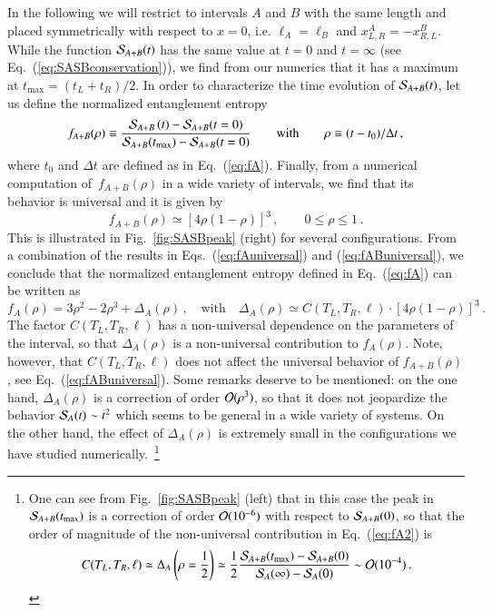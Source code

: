 \documentclass[epj]{webofc}
\begin{document}
In the following we will restrict to intervals $A$ and $B$ with the same length and placed symmetrically with respect to $x=0$, i.e. $\ell_A = \ell_B$ and $x_{L,R}^A = -x_{R,L}^B$. While the function ${\cal S}_{A+B}(t)$ has the same value at $t=0$ and $t=\infty$ (see Eq.~(\ref{eq:SASBconservation})), we find from our numerics that it has a maximum at $t_{\textrm{max}} = (t_L + t_R)/2$. In order to characterize the time evolution of ${\cal S}_{A+B}(t)$, let us define the normalized entanglement entropy
\begin{equation}
f_{A+B}(\rho) \equiv \frac{{\cal S}_{A+B}\left( t \right)-{\cal S}_{A+B}(t=0)}{{\cal S}_{A+B}(t_{\textrm{max}})-{\cal S}_{A+B}(t=0)} \qquad \textrm{with} \qquad \rho \equiv (t-t_0)/\Delta t  \,,  \label{eq:fAB}
\end{equation}
where $t_0$ and $\Delta t$ are defined as in Eq.~(\ref{eq:fA}). Finally, from a numerical computation of~$f_{A+B}(\rho)$ in a wide variety of intervals, we find that its behavior is universal and it is given by
\begin{equation}
f_{A+B}(\rho) \simeq \left[ 4\rho(1-\rho)\right]^3 \,, \qquad 0 \le \rho \le 1 \,. \label{eq:fABuniversal}
\end{equation}
This is illustrated in Fig.~\ref{fig:SASBpeak} (right) for several configurations. From a combination of the results in Eqs.~(\ref{eq:fAuniversal}) and (\ref{eq:fABuniversal}), we conclude that the normalized entanglement entropy defined in Eq.~(\ref{eq:fA}) can be written as
\begin{equation}
f_A(\rho) = 3 \rho^2 - 2 \rho^3 + \Delta_A(\rho)   \,, \quad  \textrm{with} \quad \Delta_A(\rho) \simeq   C(T_L, T_R, \ell)  \cdot [4\rho(1-\rho)]^3 \,. \label{eq:fA2}
\end{equation}
The factor $C(T_L, T_R, \ell)$ has a non-universal dependence on the parameters of the interval, so that $\Delta_A(\rho)$ is a non-universal contribution to $f_A(\rho)$. Note, however, that $C(T_L,T_R,\ell)$ does not affect the universal behavior of $f_{A+B}(\rho)$, see Eq.~(\ref{eq:fABuniversal}). Some remarks deserve to be mentioned: on the one hand, $\Delta_A(\rho)$ is a correction of order ${\cal O}(\rho^3)$, so that it does not jeopardize the behavior ${\cal S}_A(t) \sim t^2$ which seems to be general in a wide variety of systems. On the other hand, the effect of $\Delta_A(\rho)$ is extremely small in the configurations we have studied numerically.~\footnote{One can see from Fig.~\ref{fig:SASBpeak} (left) that in this case the peak in ${\cal S}_{A+B}(t_{\textrm{max}})$ is a correction of order ${\cal O}(10^{-6})$ with respect to ${\cal S}_{A+B}(0)$, so that the order of magnitude of the non-universal contribution in Eq.~(\ref{eq:fA2}) is 
\begin{equation}
C(T_L,T_R,\ell) \simeq \Delta_A\left(\rho=\frac{1}{2}\right)  \simeq \frac{1}{2} \frac{ {\cal S}_{A+B}(t_{\textrm{max}}) - {\cal S}_{A+B}(0)  }{  {\cal S}_A(\infty)-{\cal S}_A(0) } \sim {\cal O}(10^{-4}) \,.
\end{equation}
}
\end{document}
